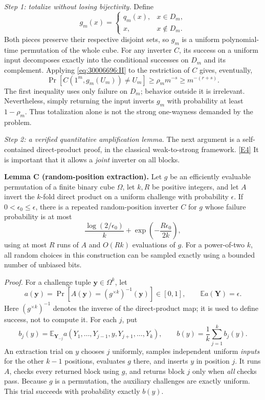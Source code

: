 \documentclass[11pt,a4paper]{article}
\newcommand{\E}{\mathbb{E}}
\newcommand{\eref}[2]{\hyperlink{extra:#1:#2}{[E#2]}}
\numberwithin{equation}{section}
\begin{document}
\textit{Step 1: totalize without losing bijectivity.}
Define
\begin{equation}\label{eq:30006696:guard}
 g_m(x)=\begin{cases}q_m(x),&x\in D_m,\\x,&x\notin D_m.\end{cases}
\end{equation}
Both pieces preserve their respective disjoint sets, so $g_m$ is a
uniform polynomial-time permutation of the whole cube. For any
inverter $C$, its success on a uniform input decomposes exactly into the
conditional successes on $D_m$ and its complement. Applying
\eqref{eq:30006696:H} to the restriction of $C$ gives, eventually,
\begin{equation}\label{eq:30006696:weak}
 \Pr[C(1^m,g_m(U_m))\ne U_m]
       \ge \rho_m m^{-s}\ge m^{-(r+s)}.
\end{equation}
The first inequality uses only failure on $D_m$; behavior outside it is
irrelevant. Nevertheless, simply returning the input inverts $g_m$ with
probability at least $1-\rho_m$. Thus totalization alone is not the
strong one-wayness demanded by the problem.

\textit{Step 2: a verified quantitative amplification lemma.}
The next argument is a self-contained direct-product proof, in the
classical weak-to-strong framework. \eref{30006696}{4}
It is important that it allows a \emph{joint} inverter on all blocks.

\textbf{Lemma C (random-position extraction).}
Let $g$ be an efficiently evaluable permutation of a finite binary cube
$\Omega$, let $k,R$ be positive integers, and let $A$ invert the
$k$-fold direct product on a uniform
challenge with probability $\epsilon$. If
$0<\epsilon_0\le\epsilon$, there is a repeated random-position inverter
$C$ for $g$ whose failure probability is at most
\begin{equation}\label{eq:30006696:extract}
 \frac{\log(2/\epsilon_0)}{k}
     +\exp\left(-\frac{R\epsilon_0}{2k}\right),
\end{equation}
using at most $R$ runs of $A$ and $O(Rk)$ evaluations of $g$.
For a power-of-two $k$, all random choices in this construction can be
sampled exactly using a bounded number of unbiased bits.

\textit{Proof.}
For a challenge tuple $\mathbf y\in\Omega^k$, let
\[
 a(\mathbf y)=\Pr[A(\mathbf y)=(g^{\times k})^{-1}(\mathbf y)]\in[0,1],
 \qquad \E a(\mathbf Y)=\epsilon.
\]
Here $(g^{\times k})^{-1}$ denotes the inverse of the direct-product map;
it is used to define success, not to compute it. For each $j$, put
\[
 b_j(y)=\E_{\mathbf Y_{-j}}a(Y_1,\ldots,Y_{j-1},y,Y_{j+1},\ldots,Y_k),
 \qquad b(y)=\frac1k\sum_{j=1}^k b_j(y).
\]
An extraction trial on $y$ chooses $j$ uniformly, samples independent
uniform \emph{inputs} for the other $k-1$ positions, evaluates $g$ there,
and inserts $y$ in position $j$. It runs $A$, checks every returned block
using $g$, and returns block $j$ only when \emph{all} checks pass.
Because $g$ is a permutation, the auxiliary challenges are exactly
uniform. This trial succeeds with probability exactly $b(y)$.
\end{document}

